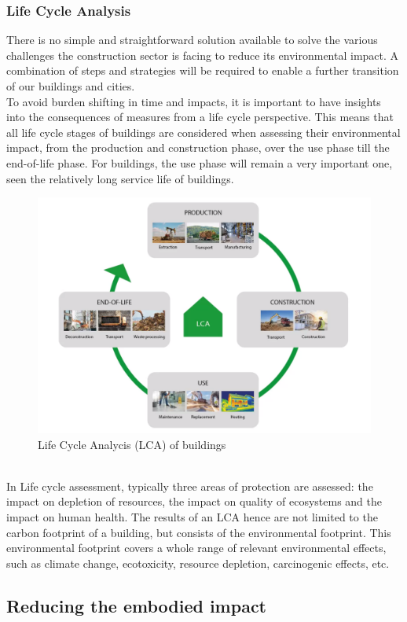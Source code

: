 \documentclass[../summary.tex]{subfiles}
\begin{document}
	\subsubsection{Life Cycle Analysis}
	
	There is no simple and straightforward solution available to solve the various challenges the construction sector is facing to reduce its environmental impact. A combination of steps and strategies will be required to enable a further transition of our buildings and cities.
	\\
	To avoid burden shifting in time and impacts, it is important to have insights into the consequences of measures from a life cycle perspective. This means that all life cycle stages of buildings are considered when assessing their environmental impact, from the production and construction phase, over the use phase till the end-of-life phase. For buildings, the use phase will remain a very important one, seen the relatively long service life of buildings.
	
	\begin{figure}[H]
		\centering
		\includegraphics[width=0.7\linewidth]{../images/8-LCA}
		\caption{Life Cycle Analycis (LCA) of buildings}
		\label{fig:8-lca}
	\end{figure}
	
	\ \\
	In Life cycle assessment, typically three areas of protection are assessed: the impact on depletion of resources, the impact on quality of ecosystems and the impact on human health. The results of an LCA hence are not limited to the carbon footprint of a building, but consists of the environmental footprint. This environmental footprint covers a whole range of relevant environmental effects, such as climate change, ecotoxicity, resource depletion, carcinogenic effects, etc.
	
	\subsection{Reducing the embodied impact}
	
\end{document}
